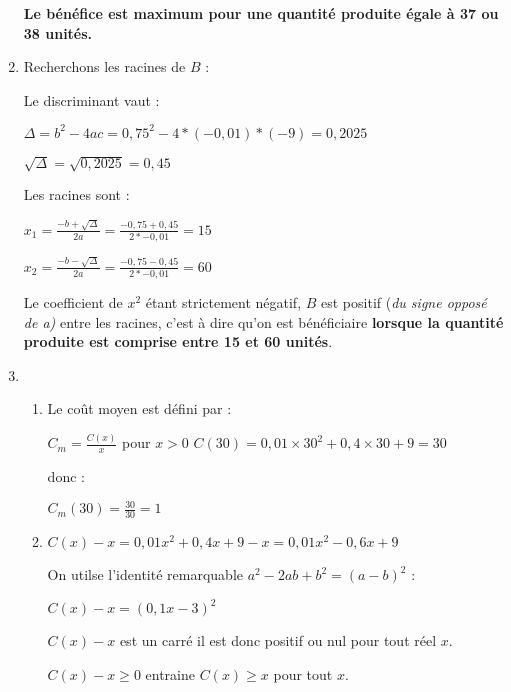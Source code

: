 \begin{corrige}
\begin{enumerate}
          \textbf{Le bénéfice est maximum pour une quantité produite égale à 37 ou 38 unités.}
          \item
          Recherchons les racines de $B$ :
          \par
          Le discriminant vaut :
          \par
          $\Delta =b^{2}-4ac = 0,75^{2}-4*\left(-0,01\right)*\left(-9\right) = 0,2025$
          \par
          $\sqrt{\Delta } = \sqrt{0,2025} = 0,45$
          \par
          Les racines sont :
          \par
          $x_{1} = \frac{-b+\sqrt{\Delta }}{2a} = \frac{-0,75+0,45}{2*-0,01} = 15$
          \par
          $x_{2} = \frac{-b-\sqrt{\Delta }}{2a} = \frac{-0,75-0,45}{2*-0,01} = 60$
          \par
          Le coefficient de $x^{2}$ étant strictement négatif, $B$ est positif (\textit{du signe opposé de a)} entre les racines, c'est à dire qu'on est bénéficiaire \textbf{lorsque la quantité produite est comprise entre 15 et 60 unités}.
          \item
          \begin{enumerate}[label=\alph*.]
               \item
               Le coût moyen est défini par :
               \par
               $C_{m}=\frac{C\left(x\right)}{x}$ pour \textbf{$x  > 0$}
               $C\left(30\right)=0,01\times 30^{2}+0,4\times 30+9= 30$
               \par
               donc :
               \par
               $C_{m}\left(30\right)=\frac{30}{30}=1$
               \item
               $C\left(x\right)-x=0,01x^{2}+0,4x+9-x=0,01x^{2}-0,6x+9$
               \par
               On utilse l'identité remarquable $a^{2}-2ab+b^{2}=\left(a-b\right)^{2}$ :
               \par
               $C\left(x\right)-x=\left(0,1x-3\right)^{2}$
               \par
               $C\left(x\right)-x$ est un carré il est donc positif ou nul pour tout réel $x$.
               \par
               $C\left(x\right)-x\geqslant 0$ entraine $C\left(x\right)\geqslant x$ pour tout $x$.
               \par

\end{enumerate}
\end{enumerate}
\end{corrige}
